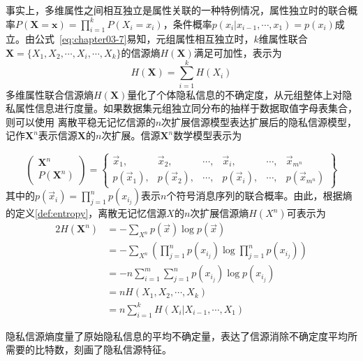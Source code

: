 事实上，多维属性之间相互独立是属性关联的一种特例情况，属性独立时的联合概率$P(\bm{X}=\bm{x})=\prod_{i=1}^{k} P(X_i=x_i)$，条件概率$p(x_i|x_{i-1},\cdots,x_1)=p(x_i)$成立。由公式~\ref{eq:chapter03-7}易知，元组属性相互独立时，$k$维属性联合$\bm{X}=\{X_1,X_2,\cdots,X_i,\cdots,X_k\}$的信源熵$H(\bm{X})$满足可加性，表示为
\begin{equation}
	H(\bm{X})=\sum_{i=1}^{k}H(X_i)
\end{equation}
多维属性联合信源熵$H(\bm{X})$量化了个体隐私信息的不确定度，从元组整体上对隐私属性信息进行度量。如果数据集元组独立同分布的抽样于数据取值字母表集合，则可以使用
离散平稳无记忆信源的$n$次扩展信源模型表达扩展后的隐私信源模型，记作$\bm{X}^{n}$表示信源$\bm{X}$的$n$次扩展。信源$\bm{X}^{n}$数学模型表示为

\begin{equation}
	\begin{pmatrix}
		\bm{X}^n\\
		P(\bm{X}^n)
	\end{pmatrix}=\begin{Bmatrix}
		\vec{x}_{1}, & \vec{x}_{2}, & \cdots,  & \vec{x}_{i}, & \cdots , & \vec{x}_{m^n}\\
		p(\vec{x}_{1}),& p(\vec{x}_{2}), & \cdots,& p(\vec{x}_{i}), & \cdots, & p(\vec{x}_{m^n})
	\end{Bmatrix}
\end{equation}
其中的$p(\vec{x}_{i})=\prod_{j=1}^{n}p(x_{i_j})$表示$n$个符号消息序列的联合概率。由此，根据熵的定义\ref{def:entropy}，离散无记忆信源$X$的$n$次扩展信源熵$H(X^n)$可表示为
\begin{alignat}{2}
	H(\bm{X}^{n})  &=  -\sum_{X^n}p(\vec{x}) \log p(\vec{x}) \\
	& =  -\sum_{X^n}\left(\prod_{j=1}^{n}p(x_{i_j})\log \prod_{j=1}^{n}p(x_{i_j})\right)\\
	& = -n\sum_{i=1}^{m}\sum_{j=1}^{n}p(x_{i_j}) \log p(x_{i_j}) \\
	& = nH(X_1,X_2,\cdots,X_k)\\
	& =n\sum_{i=1}^{k}H(X_i|X_{i-1},\cdots,X_1)
\end{alignat}

隐私信源熵度量了原始隐私信息的平均不确定量，表达了信源消除不确定度平均所需要的比特数，刻画了隐私信源特征。
